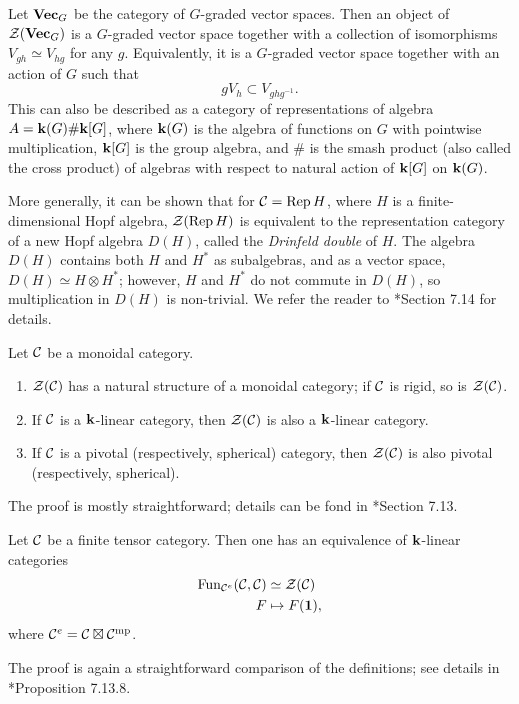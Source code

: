 \begin{example}\label{x:center-vectg}
  Let $\mathbf{Vec}_G$ be the category of $G$-graded vector spaces. Then an object
  of $\mathcal{Z}(\mathbf{Vec}_G)$ is a $G$-graded vector space together with a collection
  of isomorphisms $V_{gh}\simeq V_{hg}$ for any $g$. Equivalently, it is a
  $G$-graded vector space together with an action of $G$ such that
  $$
   gV_h\subset V_{ghg^{-1}}.
  $$
  This can also be described as a category of representations of algebra
  $A=\mathbf{k}(G)\# \mathbf{k}[G]$, where $\mathbf{k}(G)$ is the algebra of functions on $G$
  with pointwise multiplication, $\mathbf{k}[G]$ is the group algebra, and $\#$ is
  the smash product (also called the cross product) of algebras with
  respect to natural action of $\mathbf{k}[G]$ on $\mathbf{k}(G)$.
\end{example}
More generally, it can be shown that for $\mathcal{C}=\operatorname{Rep} H$, where $H$ is a
finite-dimensional Hopf algebra, $\mathcal{Z}(\operatorname{Rep} H)$ is equivalent to the
representation category of a new Hopf algebra $D(H)$, called the \emph{Drinfeld
double} of $H$. The algebra $D(H)$ contains both $H$ and
$H^*$ as subalgebras, and as a vector space, $D(H)\simeq H\otimes H^*$; however,
$H$ and $H^*$ do not commute in $D(H)$, so multiplication in $D(H)$ is
non-trivial. We refer the reader to *{Section 7.14} for
details.

\begin{lemma}\label{l:drinfeld-monoidal}
  Let $\mathcal{C}$ be a monoidal category.
  \begin{enumerate}
    \item $\mathcal{Z}(\mathcal{C})$ has a natural structure of a monoidal category; if
      $\mathcal{C}$ is rigid, so is $\mathcal{Z}(\mathcal{C})$.
    \item If $\mathcal{C}$ is a $\mathbf{k}$-linear category, then $\mathcal{Z}(\mathcal{C})$ is also
      a $\mathbf{k}$-linear category.
    \item If $\mathcal{C}$ is a pivotal \textup{(}respectively, spherical\textup{)} category, then
      $\mathcal{Z}(\mathcal{C})$ is also pivotal \textup{(}respectively, spherical\textup{)}.
  \end{enumerate}
\end{lemma}
The proof is mostly straightforward; details can be fond in
*{Section 7.13}.

\begin{lemma}\label{l:dr-center-2}
  Let $\mathcal{C}$ be a finite tensor category. Then one has an equivalence of
  $\mathbf{k}$-linear categories
  \begin{align*}
    \operatorname{Fun}_{\mathcal{C}^e}(\mathcal{C}, \mathcal{C})&\simeq \mathcal{Z}(\mathcal{C})\\
                              F&\mapsto F(\mathbf{1}),
  \end{align*}
  where $\mathcal{C}^e=\mathcal{C}\boxtimes\mathcal{C}^{{\mathrm{mp}}}$.
\end{lemma}
The proof is again a straightforward comparison of the definitions; see details
in  *{Proposition 7.13.8}.



